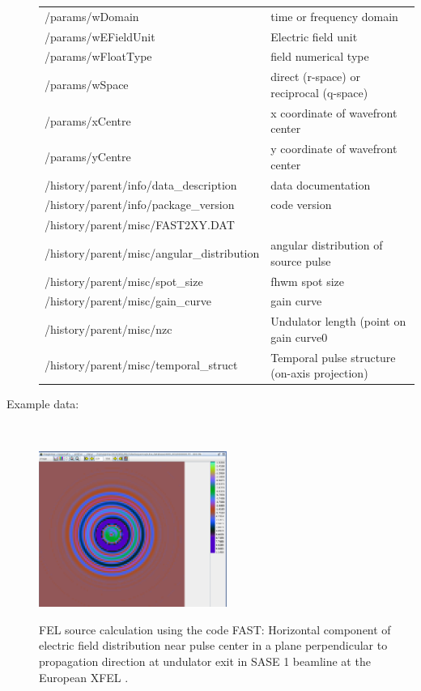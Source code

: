 \documentclass[12pt]{scrartcl}
\begin{document}
\begin{description}
{\begin{tabular}{l|l}
      /params/wDomain     & time or frequency domain\\
      /params/wEFieldUnit     & Electric field unit \\
      /params/wFloatType    &  field numerical type \\
      /params/wSpace      &  direct (r-space) or reciprocal (q-space)\\
      /params/xCentre     & x coordinate of wavefront center \\
      /params/yCentre     & y coordinate of wavefront center \\
      /history/parent/info/data\_description     & data documentation \\
      /history/parent/info/package\_version    & code version \\
      /history/parent/misc/FAST2XY.DAT    &  \\
      /history/parent/misc/angular\_distribution     & angular distribution of source pulse \\
      /history/parent/misc/spot\_size    & fhwm spot size \\
      /history/parent/misc/gain\_curve     & gain curve \\
      /history/parent/misc/nzc    & Undulator length (point on gain curve0 \\
      /history/parent/misc/temporal\_struct    & Temporal pulse structure (on-axis projection) \\
      \hline
      \hline
    \end{tabular}
      }
    \item[Example data:]\ \\[2ex]
        \begin{center}
          \includegraphics[width=0.5\textwidth,angle=0,clip]{figures/felsource_demo}
        \end{center}
        \scriptsize{FEL source calculation using the code FAST: Horizontal
        component of electric field distribution near pulse center in a plane perpendicular to
      propagation direction at undulator exit in SASE 1 beamline at the European
      XFEL \cite{xpd_xfel}.}
    \end{description}
\end{document}

